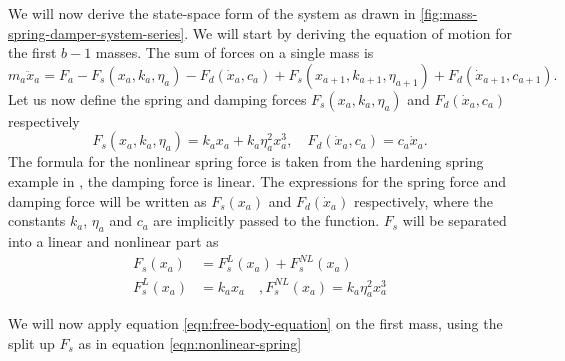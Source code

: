 We will now derive the state-space form of the system as drawn in \autoref{fig:mass-spring-damper-system-series}. We will start by deriving the equation of motion for the first $b-1$ masses. The sum of forces on a single mass is
\begin{equation}\label{eqn:free-body-equation}
    m_a\ddot{x}_a = F_a - F_s(x_a,k_a,\eta_a) - F_d(\dot{x}_a,c_a) + F_s(x_{a+1},k_{a+1},\eta_{a+1}) + F_d(\dot{x}_{a+1},c_{a+1}).
\end{equation}
Let us now define the spring and damping forces $F_s(x_a,k_a,\eta_a)$ and $F_d(\dot{x}_a,c_a)$ respectively
\begin{equation*}
    F_s(x_a,k_a,\eta_a) = k_ax_a + k_a \eta_a^2 x_a^3, \quad F_d(\dot{x}_a,c_a) = c_a\dot{x}_a.
\end{equation*}
The formula for the nonlinear spring force is taken from the hardening spring example in \cite[Section 1.2.3]{Khalil2002NonlinearSystems}, the damping force is linear. The expressions for the spring force and damping force will be written as $F_s(x_a)$ and $F_d(\dot{x}_a)$ respectively, where the constants $k_a$, $\eta_a$ and $c_a$ are implicitly passed to the function. $F_s$ will be separated into a linear and nonlinear part as
\begin{equation}\label{eqn:nonlinear-spring}
    \begin{split}
        F_s(x_a) &= F_s^L(x_a) + F_s^{NL}(x_a) \\
        F_s^L(x_a) &= k_ax_a \quad , F_s^{NL}(x_a) = k_a\eta_a^2x^3_a
    \end{split}    
\end{equation}

We will now apply equation \eqref{eqn:free-body-equation} on the first mass, using the split up $F_s$ as in equation \eqref{eqn:nonlinear-spring}

